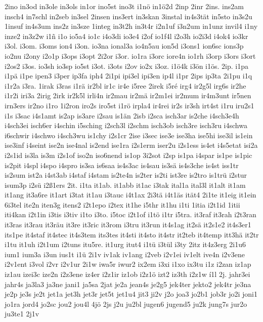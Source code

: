 {2ino
in3od
in3ole
in3ols
in1or
ino5st
ino3t
i1nö
in1ö2d
2inp
2inr
2ins.
ins2am
insch4
in7schl
in2seb
in3sel
2insen
ins3ert
in3skan
3instal
in4s3tät
in5sto
in3s2u
1insuf
in4s3um
ins2z
in3sze
1integ
in3t2h
in3t4r
i2n1uf
i3n2um
in1unz
invil4
i1ny
inze2
in3z2w
i1ñ
i1o
io5a4
io1c
i4o3di
io3e4
i2of
io1f4l
i2o3h
io2i3d
i4ok4
io3kr
i3ol.
i3om.
i3oms
ion4
i3on.
io3na
ional3a
io4n5au
ion5d
i3ons1
ion6sc
ions3p
io2nu
i2ony
i2o1p
i3ops
i3opt
2i2or
i3or.
io1ra
i3orc
iore4n
io1rh
i3orp
i3ors
i3ort
i2os2
i3os.
io3sh
io3sp
io5st
i3ot.
i3ots
i2ov
io2x
i3oz.
i1ö4k
i3ön
i1ös.
2ip.
i1pa
i1pä
i1pe
ipen3
i3per
ip3fa
iph4
2i1pi
ipi3el
ipi3en
ip4l
i1pr
2ips
ip3ta
2i1pu
i1q
i1r2a
i3ra.
1irak
i3ras
i1rä
ir2bl
ir1c
ir4e
i5ree
2irek
i5ré
irg4
ir2g5l
irg6s
ir2he
i1r2i
iri3a
2irig
2irk
ir2k5l
irli4n
ir2mau
ir2mä
ir2m1ei
ir2mum
ir4m3unt
ir5nen
irn3ers
ir2no
i1ro
1i2ron
iro2s
iro5st
i1rö
irpla4
ir4rei
ir2s
ir3sh
irt4st
i1ru
iru2s1
i1s
i3sac
i4s1amt
is2ap
is3are
i2sau
is1än
2isb
i2sca
isch3ar
is2che
i4sch3e4h
i4sch3ei
isch6er
i4schin
i5sching
i2sch3l
i2schm
isch3ob
isch3re
isch3ru
i4schwa
i6schwir
i4schwo
i4sch3wu
is1chy
i2s1cr
2ise
i3sec
ise3e
ise3ha
ise5hi
ise3il
is1ein
ise3inf
i4seint
ise2n
ise4nal
is2end
ise1ra
i2s1erm
iser2u
i2s1ess
is4et
i4s5etat
isi2a
i2s1id
is3la
is3m
i2s1of
iso2n
iso6nend
is1op
3i2sot
i2sp
is1pa
i4spar
is1pe
is1pic
is2pit
i4spl
i4spo
i4spro
is3sa
is6saa
is4s3ac
is4sau
is3sä
is4s3che
is4st
iss1tr
is2sum
ist2a
i4st3ab
i4staf
i4stam
is2te4n
is2ter
is2ti
ist3re
is2tro
is1trü
i2stur
isum3p
i2sü
i2ß1ers
2it.
i1ta
it1ab.
it1abb
it1ac
i3tak
ital1a
ital3l
it1alt
it1am
it1ang
it3a6re
it1art
i3tat
it1au
i3tauc
i4t1ax
2i3tä
i4t1äs
ität4
2i1te
it1eig
it1ein
6i3tel
ite2n
iten3g
itens2
i2t1epo
i2tex
it1he
i5thr
it1hu
i1ti
1itia
i2t1id
1itii
iti4kan
i2t1in
i3tis
i3tiv
i1to
i3to.
i5toc
i2t1of
i1tö
i1tr
i5tra.
it3raf
it3rah
i2t3ran
it3ras
it3rau
it3räu
it3re
it3ric
it3rom
i3tru
it3run
it4s1ag
it2sä
it2s1e2
it4s3er1
its1pe
it4staf
it4stec
it4s3tem
its3tes
it4sti
it4sto
it4str
it2teb
it4temp
itt3hä
it2tr
i1tu
it1uh
i2t1um
i2tuns
itu5re.
it1urg
itut4
i1tü
i3tül
i3ty
2itz
it4z3erg
2i1u6
ium1
ium3a
i3un
ius1t
i1ü
2i1v
iv1ak
iv1ang
i2veb
i2v1ei
iv1elt
ive4n
i2v3ene
i2v1ent
i3vol
i2vr
i2v1ur
2i1w
iwa5r
iwur2
ix2em
i3xi
i1xo
ix3tu
i1z
i2zan
iz1ap
iz1au
izei3c
ize2n
i2z3ene
iz4er
i2z1ir
iz1ob
i2z1ö
izt2
iz3th
i2z1w
í1l
2j.
jahr3ei
jahr4s
ja3la3
ja3ne
jani1
ja5sa
2jat
je2a
jean4s
je2g5
jek4ter
jekto2
jek4tr
je3na
je2p
je3s
je2t
jet1a
jet3h
jet3r
jet5t
jet1u4
jit3
ji2v
j2o
joa3
jo2b1
job3r
jo2i
joni1
jo1ra
jord4
jo2sc
jou2
jou4l
4jö
2js
j2u
ju2bl
jugen6
jugend5
ju2k
jung7s
jur2o
ju3te1
2j1v
}
